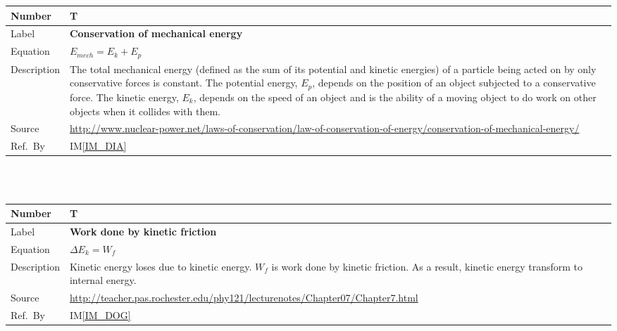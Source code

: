 \documentclass[12pt]{article}
\newcommand{\colAwidth}{0.13\textwidth}
\newcommand{\colBwidth}{0.82\textwidth}
\newcounter{theorynum} %
\newcommand{\iref}[1]{IM\ref{#1}}
\begin{document}
\noindent
\begin{minipage}{\textwidth}
	\renewcommand*{\arraystretch}{1.5}
	\begin{tabular}{| p{\colAwidth} | p{\colBwidth}|}
		\hline
		\rowcolor[gray]{0.9}
		Number& T{theorynum}\thetheorynum \label{T_CME}\\
		\hline
		Label&\bf Conservation of mechanical energy\\
		\hline
		Equation&  $E_{mech}=E_{k}+E_{p}$\\
		\hline
		
		Description & 
		The total mechanical energy (defined as the sum of its potential and kinetic energies) of a particle being acted on by only conservative forces is constant. The potential energy, $E_{p}$, depends on the position of an object subjected to a conservative force. The kinetic energy, $E_{k}$, depends on the speed of an object and is the ability of a moving object to do work on other objects when it collides with them.\\
		\hline
		Source &
		\url{http://www.nuclear-power.net/laws-of-conservation/law-of-conservation-of-energy/conservation-of-mechanical-energy/}\\
		\hline
		Ref.\ By & \iref{IM_DIA}\\
		\hline
\end{tabular}
\end{minipage}\\

~\newline

\noindent
\begin{minipage}{\textwidth}
	\renewcommand*{\arraystretch}{1.5}
	\begin{tabular}{| p{\colAwidth} | p{\colBwidth}|}
		\hline
		\rowcolor[gray]{0.9}
		Number& T{theorynum}\thetheorynum \label{T_WKF}\\
		\hline
		Label&\bf Work done by kinetic friction\\
		\hline
		Equation&  $\Delta E_{k}=W_{f}$\\
		\hline
		
		Description & 
		Kinetic energy loses due to kinetic energy. $W_{f}$ is work done by kinetic friction. As a result, kinetic energy transform to internal energy.\\
		\hline
		Source &
		\url{http://teacher.pas.rochester.edu/phy121/lecturenotes/Chapter07/Chapter7.html}\\
		\hline
		Ref.\ By & \iref{IM_DOG}\\
		\hline
	\end{tabular}
\end{minipage}\\
\end{document}
